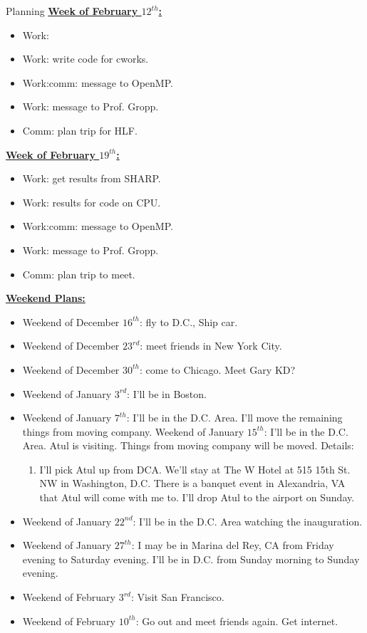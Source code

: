 \documentclass[serif, mathserif, final]{beamer}
\begin{document}
\begin{frame}
\begin{columns}
\begin{column}{0.5\textwidth}
\begin{block}{Planning}
\underline{{\bf Week of February $12^{th}$:}}
\begin{itemize}
\small \item \small Work: 
\item \small Work: write code for cworks.
\item \small Work:comm: message to OpenMP.
\item \small Work: message to Prof. Gropp. 
\item \small Comm: plan trip for HLF. 
\end{itemize}

\underline{{\bf Week of February $19^{th}$:}}
\begin{itemize}
\small \item \small Work: get results from SHARP. 
\item \small Work: results for code on CPU.
\item \small Work:comm: message to OpenMP. 
\item \small Work: message to Prof. Gropp. 
\item \small Comm: plan trip to meet. 
\end{itemize}

{\underline{\bf Weekend Plans:}} 
\begin{itemize}
\tiny \item \tiny Weekend of December $16^{th}$: fly to D.C., Ship car.
\item \tiny Weekend of December $23^{rd}$: meet friends in New York City.
\item \tiny Weekend of December $30^{th}$: come to Chicago. Meet Gary KD?
\item \tiny Weekend of January $3^{rd}$: I'll be in Boston.
\item \tiny Weekend of January $7^{th}$: I'll be in the D.C. Area. I'll move the remaining things from moving company.
\tiny \tiny Weekend of January $15^{th}$: I'll be in the
D.C. Area. Atul is visiting. Things from moving company will be
moved. Details: 
\begin{enumerate}
\tiny \item \tiny I'll pick Atul up from DCA. We'll stay at The W
Hotel at 515 15th St. NW in Washington, D.C. There is a banquet event
in Alexandria, VA that Atul will come with me to. I'll drop Atul to the airport on Sunday. 
\end{enumerate}

\item \tiny Weekend of January $22^{nd}$: I'll be in the D.C. Area watching the inauguration.
\item \tiny Weekend of January $27^{th}$: I may be in Marina del Rey, CA from Friday evening to Saturday evening. I'll be in D.C. from Sunday morning to Sunday evening.
\item \tiny Weekend of February $3^{rd}$: Visit San Francisco. 
\item \tiny Weekend of February $10^{th}$: Go out and meet friends
  again.  Get internet. 


\end{itemize}
\end{block}
\end{column}
\end{columns}
\end{frame}
\end{document}

